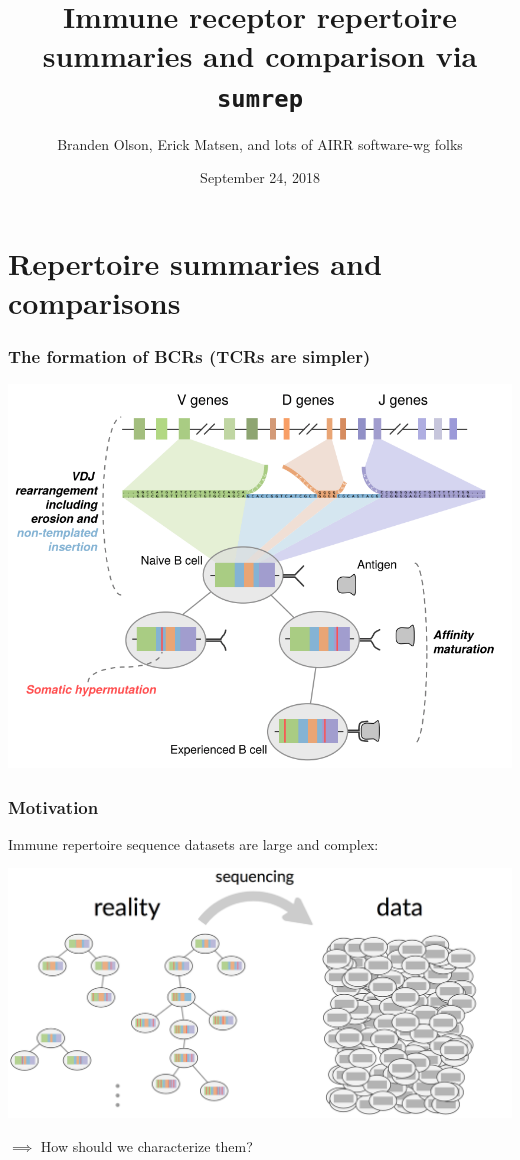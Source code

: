 \documentclass[mathserif,compress]{beamer}
\title[]{Immune receptor repertoire summaries and comparison via \texttt{sumrep}}
\author[]
{Branden Olson, Erick Matsen, and lots of AIRR software-wg folks}
\date[Sept. 24, 2018]
{September 24, 2018}
\institute[]
{
Fred Hutch
}
\renewcommand\;{\,}
\begin{document}
\begin{frame}[noframenumbering]
  \titlepage
\end{frame}

\section{Repertoire summaries and comparisons}

\begin{frame}\frametitle{The formation of BCRs (TCRs are simpler)}
\begin{center}
\includegraphics[width=\linewidth]{Images/BCRFormation.png}
\end{center}
\end{frame}

\begin{frame}\frametitle{Motivation}
Immune repertoire sequence datasets are large and complex:
\begin{center}
\includegraphics[width=\linewidth]{Images/reality-data.png}
\end{center}
$\implies$ How should we characterize them?
\end{frame}
\end{document}

